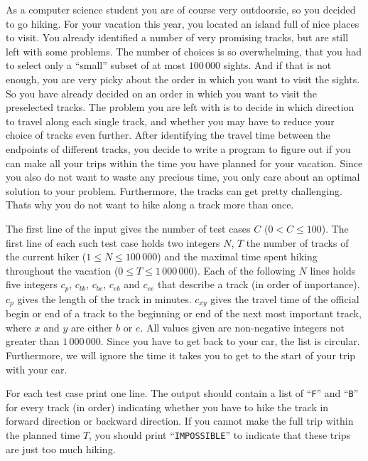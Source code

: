 As a computer science student you are of course very outdoorsie, so you decided to go hiking.
For your vacation this year, you located an island full of nice places to visit.
You already identified a number of very promising tracks, but are still left with some problems.
The number of choices is so overwhelming, that you had to select only a ``small'' subset of at most $100\,000$ sights.
And if that is not enough, you are very picky about the order in which you want to visit the sights.
So you have already decided on an order in which you want to visit the preselected tracks.
The problem you are left with is to decide in which direction to travel along each single track, and whether you may have to reduce your choice of tracks even further.
After identifying the travel time between the endpoints of different tracks, you decide to write a program to figure out if you can make all your trips within the time you have planned for your vacation.
Since you also do not want to waste any precious time, you only care about an optimal solution to your problem.
Furthermore, the tracks can get pretty challenging.
Thats why you do not want to hike along a track more than once.

\begin{Input}
    The first line of the input gives the number of test cases $C$ ($0 < C \leq 100$).
    The first line of each such test case holds two integers $N$, $T$ the number of tracks of the current hiker ($1 \leq N \leq 100\,000$) and the maximal time spent hiking throughout the vacation ($0 \leq T \leq 1\,000\,000$).
    Each of the following $N$ lines holds five integers $c_p$, $c_{bb}$, $c_{be}$, $c_{eb}$ and $c_{ee}$ that describe a track (in order of importance).
    $c_p$ gives the length of the track in minutes.
    $c_{xy}$ gives the travel time of the official begin or end of a track to the beginning or end of the next most important track, where $x$ and $y$ are either $b$ or $e$.
    All values given are non-negative integers not greater than $1\,000\,000$.
    Since you have to get back to your car, the list is circular.
    Furthermore, we will ignore the time it takes you to get to the start of your trip with your car.
\end{Input}

\begin{Output}
    For each test case print one line.
    The output should contain a list of ``\texttt{F}'' and ``\texttt{B}'' for every track (in order) indicating whether you have to hike the track in forward direction or backward direction.
    If you cannot make the full trip within the planned time $T$, you should print ``\texttt{IMPOSSIBLE}'' to indicate that these trips are just too much hiking.
\end{Output}
